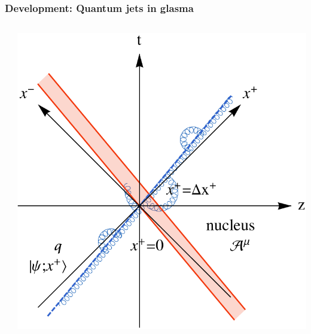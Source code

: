 \documentclass[aspectratio=169,11pt,usenames,dvipsnames]{beamer}
\begin{document}
\begin{frame}[noframenumbering]
    \frametitle{{\normalsize\color{jyured}\bfseries\sffamily Development: }Quantum jets in glasma}
    \vspace{-15pt}
    \begin{center}
        \begin{columns}[onlytextwidth,t]
           \begin{center}
                
            \end{center}

            \vspace{-10pt}
            \begin{center}
                \includegraphics[width=0.88\columnwidth]{images/F1_qgA_worldline_mono.pdf}
            \end{center}


\end{columns}
\end{center}
\end{frame}
\end{document}
